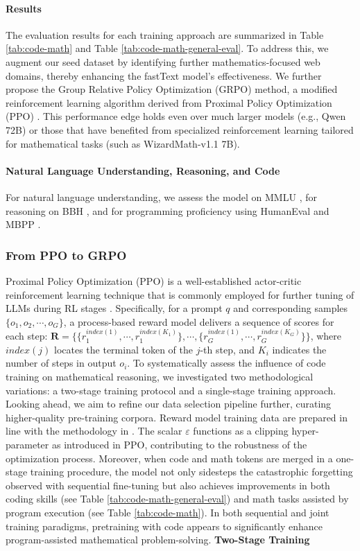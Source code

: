 \paragraph{Results}
The evaluation results for each training approach are summarized in Table \ref{tab:code-math} and Table \ref{tab:code-math-general-eval}. To address this, we augment our seed dataset by identifying further mathematics-focused web domains, thereby enhancing the fastText model's effectiveness. We further propose the Group Relative Policy Optimization (GRPO) method, a modified reinforcement learning algorithm derived from Proximal Policy Optimization (PPO) \citep{schulman2017proximal}. This performance edge holds even over much larger models (e.g., Qwen 72B) or those that have benefited from specialized reinforcement learning tailored for mathematical tasks (such as WizardMath-v1.1 7B). \paragraph{Natural Language Understanding, Reasoning, and Code}

For natural language understanding, we assess the model on MMLU \citep{mmlu}, for reasoning on BBH \citep{bbh}, and for programming proficiency using HumanEval \citep{codex} and MBPP \citep{mbpp}. \subsubsection{From PPO to GRPO} Proximal Policy Optimization (PPO) \citep{schulman2017proximal} is a well-established actor-critic reinforcement learning technique that is commonly employed for further tuning of LLMs during RL stages \citep{ouyang2022training}. Specifically, for a prompt $q$ and corresponding samples $\{o_1, o_2, \cdots, o_G\}$, a process-based reward model delivers a sequence of scores for each step: $\mathbf{R} = \{ \{r_1^{index(1)},\cdots,r_1^{index(K_1)}\}, \cdots,  \{r_G^{index(1)},\cdots,r_G^{index(K_G)}\} \}$, where $index(j)$ locates the terminal token of the $j$-th step, and $K_i$ indicates the number of steps in output $o_i$. To systematically assess the influence of code training on mathematical reasoning, we investigated two methodological variations: a two-stage training protocol and a single-stage training approach. Looking ahead, we aim to refine our data selection pipeline further, curating higher-quality pre-training corpora. Reward model training data are prepared in line with the methodology in \citep{wang2023math}. The scalar $\varepsilon$ functions as a clipping hyper-parameter as introduced in PPO, contributing to the robustness of the optimization process. Moreover, when code and math tokens are merged in a one-stage training procedure, the model not only sidesteps the catastrophic forgetting observed with sequential fine-tuning but also achieves improvements in both coding skills (see Table \ref{tab:code-math-general-eval}) and math tasks assisted by program execution (see Table \ref{tab:code-math}). In both sequential and joint training paradigms, pretraining with code appears to significantly enhance program-assisted mathematical problem-solving. \textbf{Two-Stage Training}


